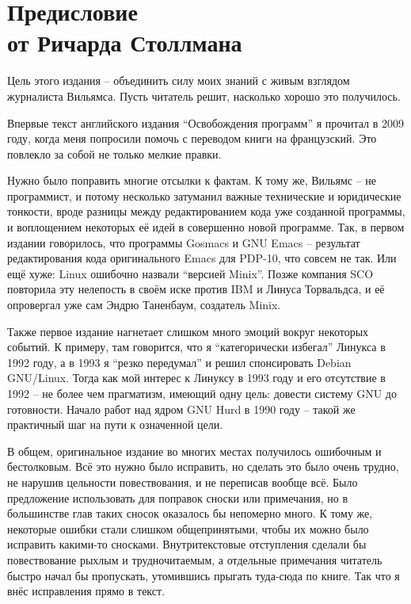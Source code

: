 
\chapter[Предисловие от Ричарда Столлмана]{Предисловие\\от Ричарда Столлмана}

Цель этого издания -- объединить силу моих знаний с живым взглядом журналиста Вильямса. Пусть читатель решит, насколько хорошо это получилось.

Впервые текст английского издания ``Освобождения программ'' я прочитал в 2009 году, когда меня попросили помочь с переводом книги на французский. Это повлекло за собой не только мелкие правки.

Нужно было поправить многие отсылки к фактам. К тому же, Вильямс -- не программист, и потому несколько затуманил важные технические и юридические тонкости, вроде разницы между редактированием кода уже созданной программы, и воплощением некоторых её идей в совершенно новой программе. Так, в первом издании говорилось, что программы Gosmacs и GNU Emacs -- результат редактирования кода оригинального Emacs для PDP-10, что совсем не так. Или ещё хуже: Linux ошибочно назвали ``версией Minix''. Позже компания SCO повторила эту нелепость в своём иске против IBM и Линуса Торвальдса, и её опровергал уже сам Эндрю Таненбаум, создатель Minix.

Также первое издание нагнетает слишком много эмоций вокруг некоторых событий. К примеру, там говорится, что я ``категорически избегал'' Линукса в 1992 году, а в 1993 я ``резко передумал'' и решил спонсировать Debian GNU/Linux. Тогда как мой интерес к Линуксу в 1993 году и его отсутствие в 1992 -- не более чем прагматизм, имеющий одну цель: довести систему GNU до готовности. Начало работ над ядром GNU Hurd в 1990 году -- такой же практичный шаг на пути к означенной цели.

В общем, оригинальное издание во многих местах получилось ошибочным и бестолковым. Всё это нужно было исправить, но сделать это было очень трудно, не нарушив цельности повествования, и не переписав вообще всё. Было предложение использовать для поправок сноски или примечания, но в большинстве глав таких сносок оказалось бы непомерно много. К тому же, некоторые ошибки стали слишком общепринятыми, чтобы их можно было исправить какими-то сносками. Внутритекстовые отступления сделали бы повествование рыхлым и трудночитаемым, а отдельные примечания читатель быстро начал бы пропускать, утомившись прыгать туда-сюда по книге. Так что я внёс исправления прямо в текст.


